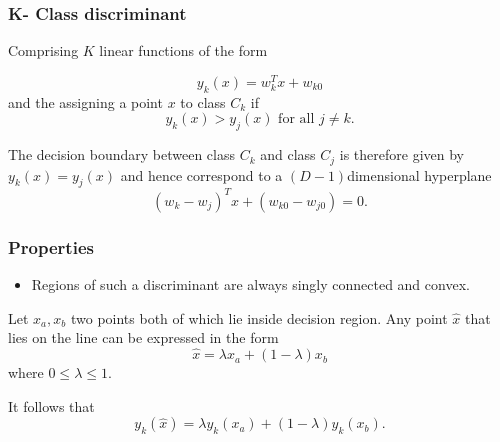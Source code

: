 \begin{frame}
    \frametitle{K- Class discriminant}
Comprising $K$ linear functions of the form 

\begin{equation}
    y_k(x) = w^T_k x + w_{k0}
\end{equation}
and the assigning a point $x$ to class $C_k$
if 
\begin{equation}
    y_k(x) > y_j(x) \text{ for all  } j \neq k.
\end{equation}

The decision boundary between class $C_k$ and class $C_j$ is therefore 
given by $y_k(x) = y_j(x)$ and hence 
correspond to a $(D-1)$dimensional hyperplane 
\begin{equation}
    (w_k - w_j)^T x 
    +
    (w_{k0} - w_{j0})
    = 
    0.
\end{equation}

\end{frame}

\begin{frame}
    \frametitle{Properties}
    \begin{itemize}
        \item Regions of such a discriminant are always singly connected and convex. 
    \end{itemize}
    Let $x_a, x_b$ two points both of which lie inside decision region. 
    Any point $\hat x$ that lies on the line 
can be expressed in the form 
\begin{equation}
    \hat x = 
    \lambda x_a +
    (1- \lambda) x_b
\end{equation}
where $0 \leq \lambda \leq 1.$ 

It follows that 
\begin{equation}
    y_k( \hat{x})
    = 
    \lambda y_k(x_a)
    +
    (1- \lambda) y_k(x_b). 
\end{equation}
\end{frame}



